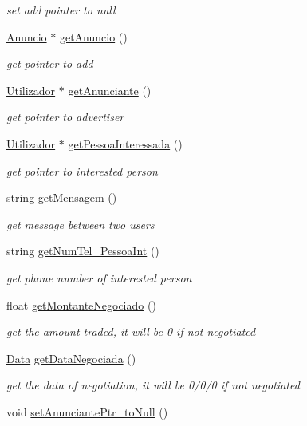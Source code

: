 \begin{DoxyCompactItemize}
\begin{DoxyCompactList}\small\item\em set add pointer to null \end{DoxyCompactList}\item 
\hyperlink{class_anuncio}{Anuncio} $\ast$ \hyperlink{class_contacto_a4ad1dc12564c5d5b495d1ec5343d396d}{get\+Anuncio} ()
\begin{DoxyCompactList}\small\item\em get pointer to add \end{DoxyCompactList}\item 
\hyperlink{class_utilizador}{Utilizador} $\ast$ \hyperlink{class_contacto_a588d6077fe57f64fcb5b436db6a0c844}{get\+Anunciante} ()
\begin{DoxyCompactList}\small\item\em get pointer to advertiser \end{DoxyCompactList}\item 
\hyperlink{class_utilizador}{Utilizador} $\ast$ \hyperlink{class_contacto_a69478b8031acc4ab2b7a2b0522889b5c}{get\+Pessoa\+Interessada} ()
\begin{DoxyCompactList}\small\item\em get pointer to interested person \end{DoxyCompactList}\item 
string \hyperlink{class_contacto_a435afe8dfd007e6df292d7d2c5235867}{get\+Mensagem} ()
\begin{DoxyCompactList}\small\item\em get message between two users \end{DoxyCompactList}\item 
string \hyperlink{class_contacto_aee20176836aae17cac823b87f850c500}{get\+Num\+Tel\+\_\+\+Pessoa\+Int} ()
\begin{DoxyCompactList}\small\item\em get phone number of interested person \end{DoxyCompactList}\item 
float \hyperlink{class_contacto_a73657b4f2576a340e4dc7b5fe8ca0d3c}{get\+Montante\+Negociado} ()
\begin{DoxyCompactList}\small\item\em get the amount traded, it will be 0 if not negotiated \end{DoxyCompactList}\item 
\hyperlink{class_data}{Data} \hyperlink{class_contacto_aa6792efa6165813ed7d471558b502f4f}{get\+Data\+Negociada} ()
\begin{DoxyCompactList}\small\item\em get the data of negotiation, it will be 0/0/0 if not negotiated \end{DoxyCompactList}\item 
\hypertarget{class_contacto_a9ddf36376fb679d3e5ff9190329e54c5}{}void \hyperlink{class_contacto_a9ddf36376fb679d3e5ff9190329e54c5}{set\+Anunciante\+Ptr\+\_\+to\+Null} ()\label{class_contacto_a9ddf36376fb679d3e5ff9190329e54c5}


\end{DoxyCompactItemize}
